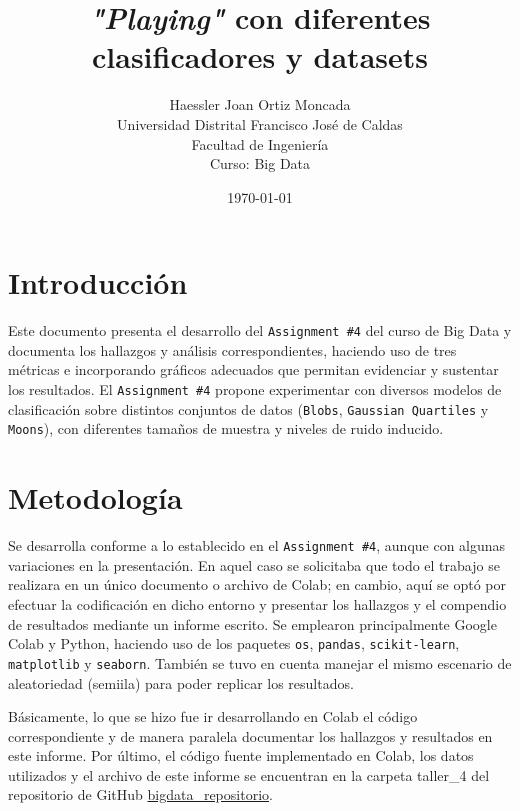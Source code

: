 \documentclass[12pt,a4paper]{article}
\title{\textbf{\textit{"Playing"} con diferentes clasificadores y datasets}}
\author{Haessler Joan Ortiz Moncada \\[0.5cm]
        Universidad Distrital Francisco José de Caldas \\
        Facultad de Ingeniería \\
        Curso: Big Data}
\date{\today}
\begin{document}
\maketitle

\section{Introducción}
Este documento presenta el desarrollo del \texttt{Assignment \#4} del curso de Big Data y documenta 
los hallazgos y análisis correspondientes, haciendo uso de tres métricas e incorporando gráficos 
adecuados que permitan evidenciar y sustentar los resultados. El \texttt{Assignment \#4} propone 
experimentar con diversos modelos de clasificación sobre distintos conjuntos de datos (\texttt{Blobs}, 
\texttt{Gaussian Quartiles} y \texttt{Moons}), con diferentes tamaños de muestra y niveles de ruido 
inducido.

\section{Metodología}
Se desarrolla conforme a lo establecido en el \texttt{Assignment \#4}, aunque con algunas variaciones 
en la presentación. En aquel caso se solicitaba que todo el trabajo se realizara en un único documento o 
archivo de Colab; en cambio, aquí se optó por efectuar la codificación en dicho entorno y presentar los 
hallazgos y el compendio de resultados mediante un informe escrito. Se emplearon principalmente Google Colab y Python, 
haciendo uso de los paquetes \texttt{os}, \texttt{pandas}, \texttt{scikit-learn}, \texttt{matplotlib} y \texttt{seaborn}.
También se tuvo en cuenta manejar el mismo escenario de aleatoriedad (semiila) para poder replicar los resultados.

Básicamente, lo que se hizo fue ir desarrollando en Colab el código correspondiente y de manera 
paralela documentar los hallazgos y resultados en este informe. Por último, el código fuente implementado en Colab, 
los datos utilizados y el archivo de este informe se encuentran en la carpeta taller\_4 del repositorio de 
GitHub \href{https://github.com/HaesslerOrtiz/bigdata}{bigdata\_repositorio}.
\end{document}
